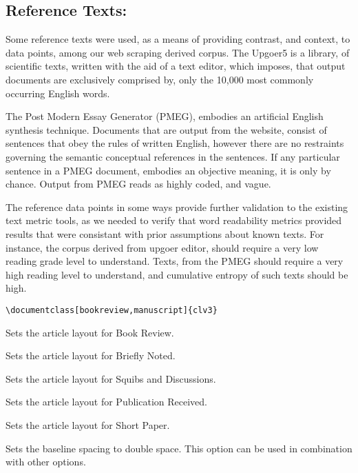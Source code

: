\documentclass{clv3}
\begin{document}
\subsection{Reference Texts:}

Some reference texts were used, as a means of providing contrast, and context, to data points, among our web scraping derived corpus. The Upgoer5 is a library, of scientific texts, written with the aid of a text editor, which imposes, that output documents are exclusively comprised by, only the 10,000 most commonly occurring English words.

The Post Modern Essay Generator (PMEG), embodies an artificial English synthesis technique. Documents that are output from the website, consist of sentences that obey the rules of written English, however there are no restraints governing the semantic conceptual references in the sentences. If any particular sentence in a PMEG document, embodies an objective meaning, it is only by chance. Output from PMEG reads as highly coded, and vague.

The reference data points in some ways provide further validation to the existing text metric tools, as we needed to verify that word readability metrics provided results that were consistant with prior assumptions about known texts. For instance, the corpus derived from upgoer editor, should require a very low reading grade level to understand. Texts, from the PMEG should require a very high reading level to understand, and cumulative entropy of such texts should be high.


\verb|\documentclass[bookreview,manuscript]{clv3}|


\begin{deflist}
\item[bookreview] Sets the article layout for Book Review.
\item[brief] Sets the article layout for Briefly Noted.
\item[discussion] Sets the article layout for Squibs and Discussions.
\item[pubrec] Sets the article layout for Publication Received.
\item[shortpaper] Sets the article layout for Short Paper.
\item[manuscript] Sets the baseline spacing to double space. This
option can be used in combination with other options.
\end{deflist}
\end{document}
